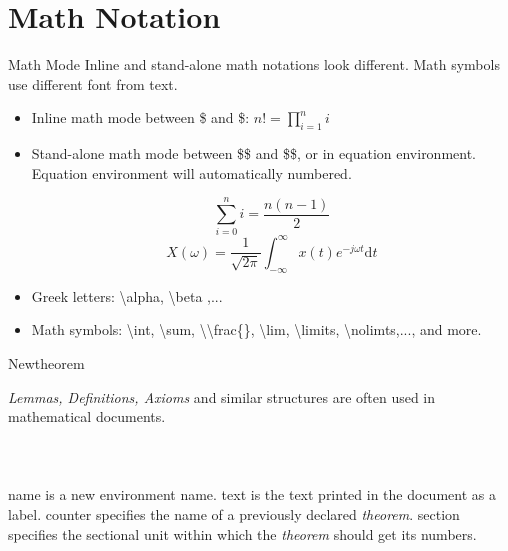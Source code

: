 \documentclass[10pt]{beamer}
\begin{document}
\section{Math Notation}
\begin{frame}{Math Mode}
    Inline and stand-alone math notations look different. Math symbols
    use different font from text.
\begin{itemize}
    \item Inline math mode between \$ and \$: $n!=\prod_{i=1}^n i$
    \item Stand-alone math mode between \$\$ and \$\$, or in
        \alert{equation} environment. Equation environment will
        automatically numbered.

        \begin{equation}
            \sum_{i=0}^n i = \frac{n (n-1)}{2}
        \end{equation}
        \begin{equation}
            X(\omega) =\frac{1}{\sqrt{2\pi}} \int_{-\infty}^{\infty}
                x(t) e^{-j\omega t}\mathrm{d} t
        \end{equation}
    \item Greek letters: \textbackslash alpha, \textbackslash beta ,...
    \item Math symbols: \textbackslash int, \textbackslash sum,
        \textbackslash \textbackslash frac\{\}, \textbackslash lim,
        \textbackslash limits, \textbackslash nolimts,..., and more.

\end{itemize}
\end{frame}

\begin{frame}{Newtheorem}

{\em Lemmas, Definitions, Axioms} and similar structures are often used
in mathematical documents.
\ \\ \ \\

\ \\ \ \\

\alert{name} is a new environment name. \alert{text} is the text
printed in the document as a label. \alert{counter} specifies the 
name of a previously declared {\em theorem}. \alert{section} specifies
the sectional unit within which the {\em theorem} should get its numbers.

\end{frame}
\end{document}
